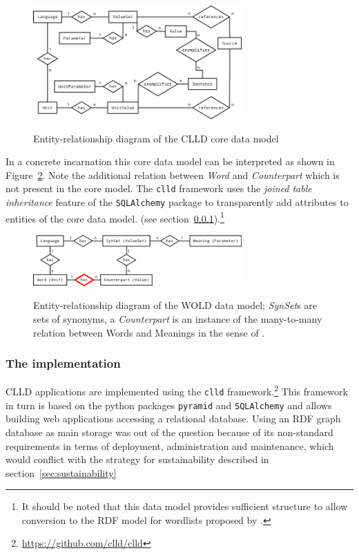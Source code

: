 \documentclass[a4paper,10pt]{article}
\begin{document}
\begin{figure}[h!]
  \caption{Entity-relationship diagram of the CLLD core data model}
  \centering
\includegraphics[width=8cm]{clld_erd.png}
\label{cllddatamodel}
\end{figure}

In a concrete incarnation this core data model can be interpreted as shown in Figure~\ref{wolddatamodel}.
Note the additional relation between \emph{Word} and \emph{Counterpart} which is not present in the core model.
The \texttt{clld} framework uses the \emph{joined table inheritance} feature of the \texttt{SQLAlchemy} package
to transparently add attributes to entities of the core data model. 
(see section~\ref{sec:implementation}).\footnote{It should be noted that this data model provides
sufficient structure to allow conversion to the RDF model for wordlists proposed by
.}


\begin{figure}[h!]
  \caption{Entity-relationship diagram of the WOLD data model; \textit{SynSet}s are sets of synonyms,
  a \textit{Counterpart} is an instance of the many-to-many relation between Words and Meanings
  in the sense of .\vspace{0.3cm}}
  \centering
\includegraphics[width=8cm]{wold_erd.png}
\label{wolddatamodel}
\end{figure}


\subsubsection{The implementation}
\label{sec:implementation}
CLLD applications are implemented using the \texttt{clld} framework.\footnote{\url{https://github.com/clld/clld}}
This framework in turn is based on the python packages \texttt{pyramid} and \texttt{SQLAlchemy}
and allows building web applications accessing a relational database.
Using an RDF graph database as main storage was out of the question because of its non-standard requirements
in terms of deployment, administration and maintenance, which would conflict with the strategy
for sustainability described in section~\ref{sec:sustainability}
\end{document}
